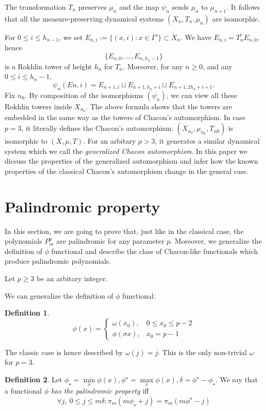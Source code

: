 \documentclass[a4paper]{article}
\theoremstyle{plain}
\theoremstyle{definition}
\newtheorem{definition}{Definition}
\begin{document}
The transformation $T_n$ preserves $\mu_n$ and the map $\psi_n$ sends $\mu_n$ to $\mu_{n+1}$. It follows that all the measure-preserving dynamical systems $(X_n, T_n, \mu_n)$ are isomorphic.

For $ 0 \le i \le h_{n-1}$, we set
$E_{n,i} := \{(x, i) : x \in \Gamma'\} \subset X_n$. We have $E_{n,i} = T^i_n E_{n,0}$, hence
 $$\{E_{n,0},\ldots,E_{n,h_n-1}\}$$
is a Rokhlin tower of height $h_n$ for $T_n$. Moreover, for any $n \ge 0$, and any $0 \le i \le
h_n-1$,
$$\psi_n(En,i) = E_{n+1,i} \sqcup E_{n+1,h_n+i} \sqcup E_{n+1,2h_n+i+1}.$$
Fix $n_0$. By composition of the isomorphisms $(\psi_n)$, we can view all these Rokhlin
towers inside $X_{n_0}$. The above formula shows that the towers are embedded in the
same way as the towers of Chacon’s automorphism. In case $p=3$, it literally defines the Chacon's automorphism: $(X_{n_0} , \mu_{n_0} , T_{n0})$ is isomorphic to $(X,\mu,T)$. For an arbitary $p > 3$, it generates a similar dynamical system which we call the \emph{generalized Chacon automorphism}. In this paper we dicsuss the properties of the generalized automorphism and infer how the known properties of the classical Chacon's automorphism change in the general case.

\section{Palindromic property}\label{palindromic}
In this section, we are going to prove that, just like in the classical case, the polynomials $P_m^p$ are palindromic for any parameter $p$. Moreover, we generalize the definition of $\phi$ functional and describe the class of Chacon-like functionals which produce palindromic polynomials.

Let $p \ge 3$ be an arbitary integer.

We can generalize the definition of $\phi$ functional:
\begin{definition}
    $$
    \phi(x) = \begin{cases}
                    \omega(x_0), & 0 \le x_0 \le p - 2 \\
                    \phi(\sigma x), & x_0 = p - 1
                \end{cases}
    $$
\end{definition}
    The classic case is hence described by $\omega(j)=j$. This is the only non-trivial $\omega$ for $p=3$. \\
    
\begin{definition}
Let $\phi_\star = \min\limits_x \phi(x), \phi^\star = \max\limits_x \phi(x), \delta=\phi^\star - \phi_\star$. We say that a functional $\phi$  \textit{has the palindromic property} iff 
$$
\forall j,\ 0 \le j \le m\delta:   \pi_m(m\phi_\star + j)=\pi_m(m\phi^\star-j)
$$
\end{definition}
    
\end{document}

